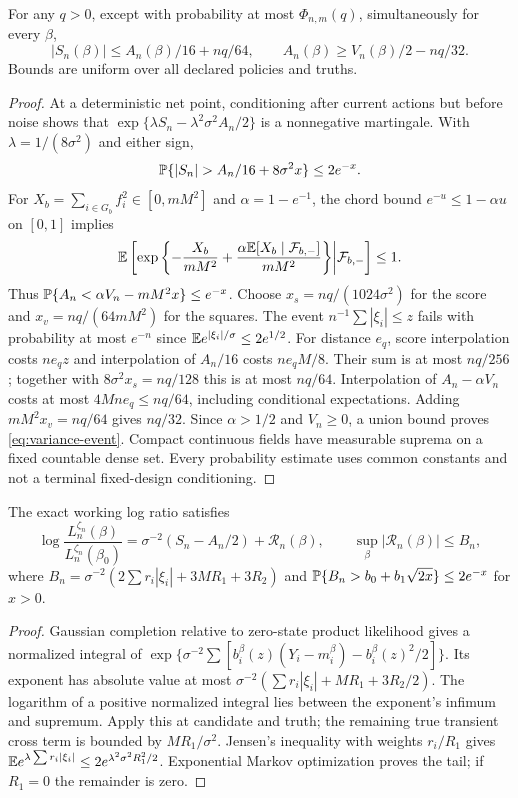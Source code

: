 \begin{theorem}
\label{thm:variance}
For any $q>0$, except with probability at most $\Phi_{n,m}(q)$, simultaneously
for every $\beta$,
\begin{equation}
 |S_n(\beta)|\le A_n(\beta)/16+nq/64,\qquad
 A_n(\beta)\ge V_n(\beta)/2-nq/32.
 \label{eq:variance-event}
\end{equation}
Bounds are uniform over all declared policies and truths.
\end{theorem}
\begin{proof}
At a deterministic net point, conditioning after current actions but before
noise shows that $\exp\{\lambda S_n-\lambda^2\sigma^2A_n/2\}$ is a
nonnegative martingale. With $\lambda=1/(8\sigma^2)$ and either sign,
\[
 \Pp\{|S_n|>A_n/16+8\sigma^2x\}\le2e^{-x}.
\]
For $X_b=\sum_{i\in G_b}f_i^2\in[0,mM^2]$ and $\alpha=1-e^{-1}$, the chord
bound $e^{-u}\le1-\alpha u$ on $[0,1]$ implies
\[
 \mathbb E\left[\exp\left\{-\frac{X_b}{mM^2}
       +\frac{\alpha\mathbb E[X_b\mid\mathcal F_{b,-}]}{mM^2}\right\}
       \middle|\mathcal F_{b,-}\right]\le1.
\]
Thus $\mathbb P\{A_n<\alpha V_n-mM^2x\}\le e^{-x}$.
Choose $x_s=nq/(1024\sigma^2)$ for the score and
$x_v=nq/(64mM^2)$ for the squares. The event
$n^{-1}\sum|\xi_i|\le z$ fails with probability at most $e^{-n}$ since
$\mathbb E e^{|\xi_i|/\sigma}\le2e^{1/2}$.
For distance $e_q$, score interpolation costs $ne_qz$ and interpolation of
$A_n/16$ costs $ne_qM/8$. Their sum is at most $nq/256$; together with
$8\sigma^2x_s=nq/128$ this is at most $nq/64$.
Interpolation of $A_n-\alpha V_n$ costs at most $4Mne_q\le nq/64$,
including conditional expectations. Adding $mM^2x_v=nq/64$ gives $nq/32$.
Since $\alpha>1/2$ and $V_n\ge0$, a union bound proves \eqref{eq:variance-event}.
Compact continuous fields have measurable suprema on a fixed countable dense
set. Every probability estimate uses common constants and not a terminal
fixed-design conditioning.
\end{proof}

\begin{lemma}
\label{lem:remainder}
The exact working log ratio satisfies
\[
 \log\frac{L_n^{\zeta_n}(\beta)}{L_n^{\zeta_n}(\beta_0)}
   =\sigma^{-2}(S_n-A_n/2)+\mathcal R_n(\beta),\qquad
 \sup_\beta|\mathcal R_n(\beta)|\le B_n,
\]
where $B_n=\sigma^{-2}(2\sum r_i|\xi_i|+3MR_1+3R_2)$ and
$\mathbb P\{B_n>b_0+b_1\sqrt{2x}\}\le2e^{-x}$ for $x>0$.
\end{lemma}
\begin{proof}
Gaussian completion relative to zero-state product likelihood gives a normalized
integral of $\exp\{\sigma^{-2}\sum[b_i^\beta(z)(Y_i-m_i^\beta)-b_i^\beta(z)^2/2]\}$.
Its exponent has absolute value at most
$\sigma^{-2}(\sum r_i|\xi_i|+MR_1+3R_2/2)$.
The logarithm of a positive normalized integral lies between the exponent's
infimum and supremum. Apply this at candidate and truth; the remaining true
transient cross term is bounded by $MR_1/\sigma^2$. Jensen's inequality with
weights $r_i/R_1$ gives
$\mathbb E e^{\lambda\sum r_i|\xi_i|}\le2e^{\lambda^2\sigma^2R_1^2/2}$.
Exponential Markov optimization proves the tail; if $R_1=0$ the remainder is zero.
\end{proof}

